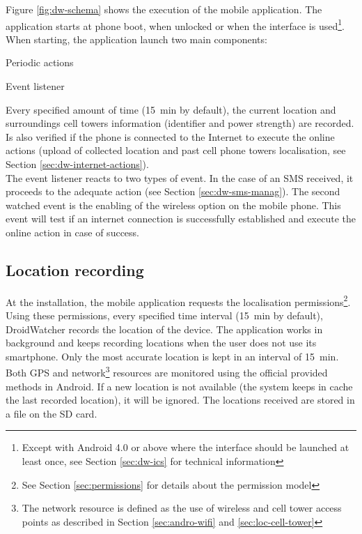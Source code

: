 Figure \ref{fig:dw-schema} shows the execution of the mobile application.
The application starts at phone boot, when unlocked or when the interface is used\footnote{Except with Android 4.0 or above where the interface should be launched at least once, see Section \ref{sec:dw-ics} for technical information}.
When starting, the application launch two  main components:

\begin{itemizealt}
\item Periodic actions
\item Event listener
\end{itemizealt}

Every specified amount of time (15~min by default), the current location and surroundings cell towers information (identifier and power strength) are recorded.
Is also verified if the phone is connected to the Internet to execute the online actions (upload of collected location and past cell phone towers localisation, see Section \ref{sec:dw-internet-actions}).\\

The event listener reacts to two types of event.
In the case of an SMS received, it proceeds to the adequate action (see Section \ref{sec:dw-sms-manag}).
The second watched event is the enabling of the wireless option on the mobile phone.
This event will test if an internet connection is successfully established and execute the online action in case of success.

\subsection{Location recording}

At the installation, the mobile application requests the localisation permissions\footnote{See Section \ref{sec:permissions} for details about the permission model}.
Using these permissions, every specified time interval (15~min by default), DroidWatcher records the location of the device.
The application works in background and keeps recording locations when the user does not use its smartphone.
Only the most accurate location is kept in an interval of 15~min.
Both GPS and network\footnote{The network resource is defined as the use of wireless and cell tower access points as described in Section \ref{sec:andro-wifi} and \ref{sec:loc-cell-tower}} resources are monitored using the official provided methods in Android.
If a new location is not available (the system keeps in cache the last recorded location), it will be ignored.
The locations received are stored in a file on the SD card.\\

